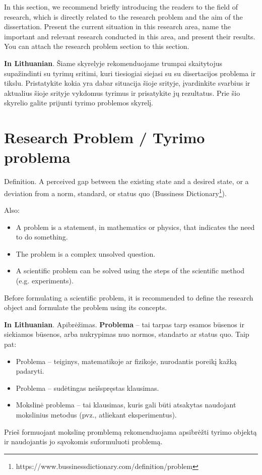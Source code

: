 In this section, we recommend briefly introducing the readers to the field of research, which is directly related to the research problem and the aim of the dissertation. Present the current situation in this research area, name the important and relevant research conducted in this area, and present their results. You can attach the research problem section to this section.

\textbf{In Lithuanian}.
Šiame skyrelyje rekomenduojame trumpai skaitytojus supažindinti su tyrimų sritimi, kuri tiesiogiai siejasi su su disertacijos problema ir tikslu. Pristatykite kokia yra dabar situacija šioje srityje, įvardinkite svarbius ir aktualius šioje srityje vykdomus tyrimus ir prisatykite jų rezultatus. Prie šio skyrelio galite prijunti tyrimo problemos skyrelį.

\section*{Research Problem / Tyrimo problema}

Definition. A perceived gap between the existing state and a desired state, or a deviation from a norm, standard, or status quo (Bussiness Dictionary\footnote{https://www.bussinessdictionary.com/definition/problem}).

Also:
\begin{itemize}
    \item A problem is a statement, in mathematics or physics, that indicates the need to do something.
    \item The problem is a complex unsolved question. 
    \item A scientific problem can be solved using the steps of the scientific method (e.g. experiments).
\end{itemize}
Before formulating a scientific problem, it is recommended to define the research object and formulate the problem using its concepts.


\textbf{In Lithuanian}. Apibrėžimas. \textbf{Problema} – tai tarpas tarp esamos būsenos ir siekiamos būsenos, arba nukrypimas nuo normos, standarto ar status quo.
Taip pat:
\begin{itemize}
    \item Problema – teiginys, matematikoje ar fizikoje, nurodantis poreikį kažką padaryti.
    \item Problema – sudėtingas neišspręstas klausimas. 
    \item Mokslinė problema – tai klausimas, kuris gali būti atsakytas naudojant mokslinius metodus (pvz., atliekant eksperimentus).
\end{itemize}
Prieš formuojant mokslinę promblemą rekomenduojama apsibrėžti tyrimo objektą ir naudojantis jo sąvokomis suformuluoti problemą.


